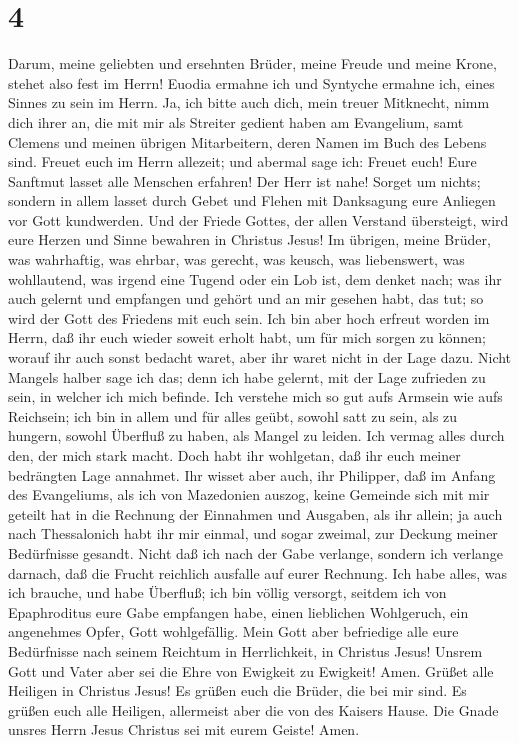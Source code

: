 \hypertarget{section-3}{%
\section{4}\label{section-3}}

 Darum, meine geliebten und ersehnten Brüder, meine Freude
und meine Krone, stehet also fest im Herrn!  Euodia
ermahne ich und Syntyche ermahne ich, eines Sinnes zu sein im Herrn.
 Ja, ich bitte auch dich, mein treuer Mitknecht, nimm dich
ihrer an, die mit mir als Streiter gedient haben am Evangelium, samt
Clemens und meinen übrigen Mitarbeitern, deren Namen im Buch des Lebens
sind.  Freuet euch im Herrn allezeit; und abermal sage
ich: Freuet euch!  Eure Sanftmut lasset alle Menschen
erfahren! Der Herr ist nahe!  Sorget um nichts; sondern in
allem lasset durch Gebet und Flehen mit Danksagung eure Anliegen vor
Gott kundwerden.  Und der Friede Gottes, der allen
Verstand übersteigt, wird eure Herzen und Sinne bewahren in Christus
Jesus!  Im übrigen, meine Brüder, was wahrhaftig, was
ehrbar, was gerecht, was keusch, was liebenswert, was wohllautend, was
irgend eine Tugend oder ein Lob ist, dem denket nach;  was
ihr auch gelernt und empfangen und gehört und an mir gesehen habt, das
tut; so wird der Gott des Friedens mit euch sein.  Ich
bin aber hoch erfreut worden im Herrn, daß ihr euch wieder soweit erholt
habt, um für mich sorgen zu können; worauf ihr auch sonst bedacht waret,
aber ihr waret nicht in der Lage dazu.  Nicht Mangels
halber sage ich das; denn ich habe gelernt, mit der Lage zufrieden zu
sein, in welcher ich mich befinde.  Ich verstehe mich so
gut aufs Armsein wie aufs Reichsein;  ich bin in allem
und für alles geübt, sowohl satt zu sein, als zu hungern, sowohl
Überfluß zu haben, als Mangel zu leiden. Ich vermag alles durch den, der
mich stark macht.  Doch habt ihr wohlgetan, daß ihr euch
meiner bedrängten Lage annahmet.  Ihr wisset aber auch,
ihr Philipper, daß im Anfang des Evangeliums, als ich von Mazedonien
auszog, keine Gemeinde sich mit mir geteilt hat in die Rechnung der
Einnahmen und Ausgaben, als ihr allein;  ja auch nach
Thessalonich habt ihr mir einmal, und sogar zweimal, zur Deckung meiner
Bedürfnisse gesandt.  Nicht daß ich nach der Gabe
verlange, sondern ich verlange darnach, daß die Frucht reichlich
ausfalle auf eurer Rechnung.  Ich habe alles, was ich
brauche, und habe Überfluß; ich bin völlig versorgt, seitdem ich von
Epaphroditus eure Gabe empfangen habe, einen lieblichen Wohlgeruch, ein
angenehmes Opfer, Gott wohlgefällig.  Mein Gott aber
befriedige alle eure Bedürfnisse nach seinem Reichtum in Herrlichkeit,
in Christus Jesus!  Unsrem Gott und Vater aber sei die
Ehre von Ewigkeit zu Ewigkeit! Amen.  Grüßet alle
Heiligen in Christus Jesus! Es grüßen euch die Brüder, die bei mir sind.
 Es grüßen euch alle Heiligen, allermeist aber die von
des Kaisers Hause.  Die Gnade unsres Herrn Jesus Christus
sei mit eurem Geiste! Amen.
